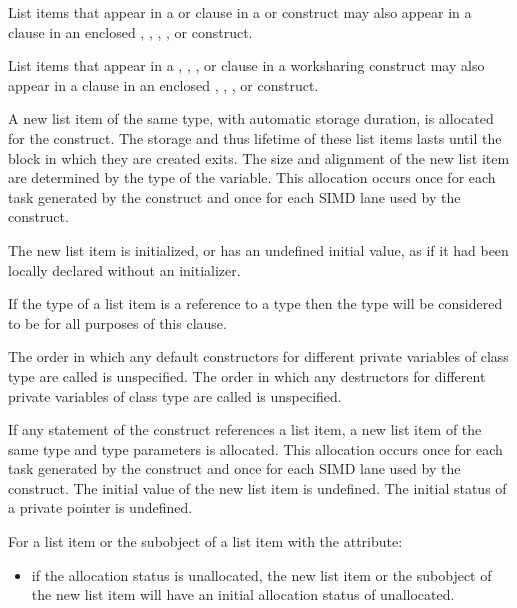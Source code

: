 {{{{List items that appear in a  or 
clause in a  or  construct may also appear in a 
clause in an enclosed , , , , or
 construct.

List items that appear in a , ,
, or  clause in a worksharing
construct may also appear in a  clause in an enclosed
, , , or  construct.

\ccppspecificstart
A new list item of the same type, with automatic storage duration, is allocated for the 
construct. The storage and thus lifetime of these list items lasts until the block in which 
they are created exits. The size and alignment of the new list item are determined by the 
type of the variable. This allocation occurs once for each task generated by the construct 
and once for each SIMD lane used by the construct.

The new list item is initialized, or has an undefined initial value, as if it had been locally 
declared without an initializer. 
\ccppspecificend

\cppspecificstart
If the type of a list item is a reference to a type  then the type will be considered to be 
 for all purposes of this clause.

The order in which any default constructors for different private variables of class type 
are called is unspecified. The order in which any destructors for different private 
variables of class type are called is unspecified.
\cppspecificend

\fortranspecificstart 
If any statement of the construct references a list item, a new list
item of the same type and type parameters is allocated. This
allocation occurs once for each task generated by the construct and
once for each SIMD lane used by the construct. The initial value of
the new list item is undefined. The initial status of a private
pointer is undefined.

For a list item or the subobject of a list item with the  attribute:

\begin{itemize}
\item if the allocation status is unallocated, the new list item or the subobject
of the new list item will have an initial allocation status of unallocated.


\end{itemize}}}}}
